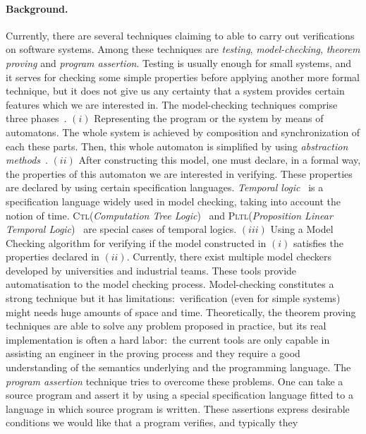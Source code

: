 \documentclass[a4paper]{llncs}
\newcommand{\ctl}{\textsc{Ctl}}
\newcommand{\pltl}{\textsc{Pltl}}
\begin{document}
\paragraph{\bf Background.}
Currently, there are several techniques claiming to able to carry out
verifications on software systems. Among these techniques are
\textit{testing}, \textit{model-checking}, \textit{theorem
proving} and \textit{program assertion}. Testing is usually enough
for small systems, and it serves for checking some simple properties
before applying another more formal technique, but it does not give
us any certainty that a system provides certain features which we are
interested in. The model-checking techniques comprise three
phases~\cite{BBLPS99}. $(i)$ Representing the program or the system
by means of automatons. The whole system is achieved by composition
and synchronization of each these parts. Then, this whole automaton is
simplified by using \textit{abstraction
methods}~\cite{CGL94,DGG97}. $(ii)$ After constructing this model, one
must declare, in a formal way, the properties of this automaton we are
interested in verifying. These properties are declared by using
certain specification
languages. \textit{Temporal logic}~\cite{Pnue77} is a specification
language widely used in model checking, taking into
account the notion of time. \ctl(\textit{Computation Tree
Logic})~\cite{CE81,EH82} and \pltl(\textit{Proposition Linear
Temporal Logic})~\cite{Pnue81} are special cases of temporal
logics. $(iii)$ Using a Model Checking algorithm for
verifying if the model constructed in $(i)$ satisfies the properties
declared in $(ii)$. Currently, there exist multiple model checkers
developed by universities and industrial teams. These tools provide
automatisation to the model checking process. Model-checking
constitutes a strong technique
but it has limitations$:$ verification (even for simple systems) might
needs huge amounts of space and time. Theoretically, the
theorem proving techniques are able to solve any problem proposed in
practice, but its real implementation is often a
hard labor$:$ the current tools are only capable in assisting an
engineer in the proving process and they require a good understanding 
of the semantics underlying and the programming language. The
\textit{program assertion} technique tries to overcome these
problems. One can take a source program and
assert it by using a special specification language fitted to a
language in
which source program is written. These assertions express desirable
conditions we would like that a program verifies, and typically they
\end{document}
